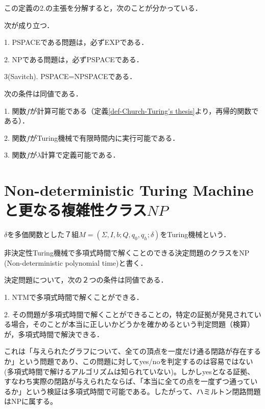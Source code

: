 \documentclass[uplatex, dvipdfmx]{jsreport}
\begin{document}
この定義の2.の主張を分解すると，次のことが分かっている．
\begin{proposition}次が成り立つ．

    1. PSPACEである問題は，必ずEXPである．

    2. NPである問題は，必ずPSPACEである．

    3(Savitch). PSPACE=NPSPACEである． 
\end{proposition}

\begin{proposition}\label{prop-computability}
    次の条件は同値である．

    1. 関数$f$が計算可能である（定義\ref{def-Church-Turing's thesis}より，再帰的関数である）．

    2. 関数$f$がTuring機械で有限時間内に実行可能である．

    3. 関数$f$が$\lambda$計算で定義可能である．
\end{proposition}

\section{Non-deterministic Turing Machineと更なる複雑性クラス$NP$}
\begin{definition}[非決定性チューリングマシン]
    $\delta$を多価関数とした７組$M=(\Sigma,I,b;Q,q_0,q_h;\delta)$をTuring機械という．
\end{definition}

\begin{definition}[判定問題の複雑性クラス２：NP]
    非決定性Turing機械で多項式時間で解くことのできる決定問題のクラスを$\mathrm{NP}$(Non-deterministic polynomial time)と書く．
\end{definition}
\begin{proposition}[NPの特徴付け]
    決定問題について，次の２つの条件は同値である．

    1. NTMで多項式時間で解くことができる．

    2. その問題が多項式時間で解くことができることの，特定の証拠が発見されている場合，そのことが本当に正しいかどうかを確かめるという判定問題（検算）が，多項式時間で解決できる．
\end{proposition}
\begin{example}[Hamilton経路問題]
    これは「与えられたグラフについて、全ての頂点を一度だけ通る閉路が存在するか」という問題であり、この問題に対してyes/noを判定するのは容易ではない(多項式時間で解けるアルゴリズムは知られていない)。しかしyesとなる証拠、すなわち実際の閉路が与えられたならば、「本当に全ての点を一度ずつ通っているか」という検証は多項式時間で可能である。したがって、ハミルトン閉路問題はNPに属する。
\end{example}
\end{document}
